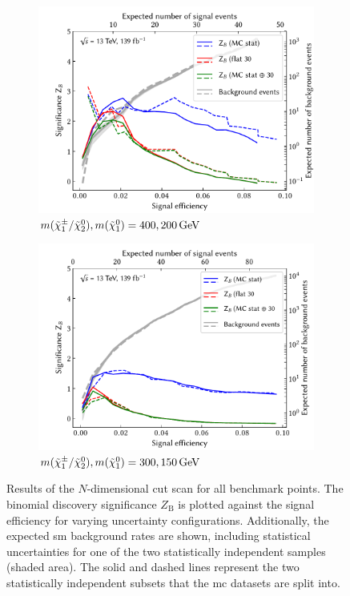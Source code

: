 \begin{figure}[hb]
\begin{subfigure}[b]{0.5\linewidth}
		\centering\includegraphics[width=1.0\textwidth]{N-1_cut_scan/z_vs_effs_400_200.pdf}
		\caption{$m(\charg/\neutr), m(\lsp) =  400, \SI{200}{\GeV}$}
	\end{subfigure}\hfill
	\begin{subfigure}[b]{0.5\linewidth}
		\centering\includegraphics[width=1.0\textwidth]{N-1_cut_scan/z_vs_effs_300_150.pdf}
		\caption{$m(\charg/\neutr), m(\lsp) =  300, \SI{150}{\GeV}$}
	\end{subfigure}\hfill

	\caption[N-dimensional cut scan results]{Results of the $N$-dimensional cut scan for all benchmark points. The binomial discovery significance $Z_\mathrm{B}$ is plotted against the signal efficiency for varying uncertainty configurations. Additionally, the expected \gls{sm} background rates are shown, including statistical uncertainties for one of the two statistically independent samples (shaded area). The solid and dashed lines represent the two statistically independent subsets that the \gls{mc} datasets are split into.}
	\label{fig:results_z_vs_eff_rest}
\end{figure}



